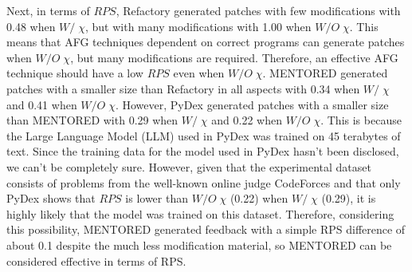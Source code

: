 \documentclass[10pt,conference]{IEEEtran}
\begin{document}
        Next, in terms of $RPS$, Refactory generated patches with few modifications with 0.48 when $W/\;\chi$, but with many modifications with 1.00 when $W/O\;\chi$. This means that AFG techniques dependent on correct programs can generate patches when $W/O\;\chi$, but many modifications are required. Therefore, an effective AFG technique should have a low $RPS$ even when $W/O\;\chi$. MENTORED generated patches with a smaller size than Refactory in all aspects with 0.34 when $W/\;\chi$ and 0.41 when $W/O\;\chi$. However, PyDex generated patches with a smaller size than MENTORED with 0.29 when $W/\;\chi$ and 0.22 when $W/O\;\chi$. This is because the Large Language Model (LLM) used in PyDex was trained on 45 terabytes of text\cite{brown2020language}. Since the training data for the model used in PyDex hasn’t been disclosed, we can’t be completely sure. However, given that the experimental dataset consists of problems from the well-known online judge CodeForces and that only PyDex shows that $RPS$ is lower than $W/O\;\chi$ (0.22) when $W/\;\chi$ (0.29), it is highly likely that the model was trained on this dataset. Therefore, considering this possibility, MENTORED generated feedback with a simple RPS difference of about 0.1 despite the much less modification material, so MENTORED can be considered effective in terms of RPS.
        
\end{document}
